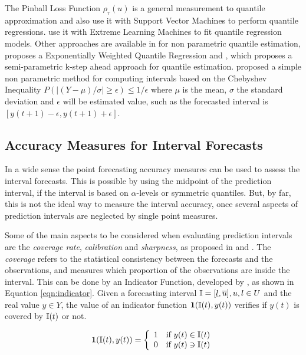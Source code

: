 The Pinball Loss Function $\rho_\tau(u)$ is a general measurement to quantile approximation and \cite{Steinwart2011} also use it with Support Vector Machines to perform quantile regressions. \cite{Wan2014} use it with Extreme Learning Machines to fit quantile regression models. Other approaches are available in \cite{Takeuchi2006} for non parametric quantile estimation,  \cite{Taylor2007} proposes a Exponentially Weighted Quantile Regression and \cite{Hansen2006}, which proposes a semi-parametric k-step ahead approach for quantile estimation. \cite{Gardner1998} proposed a simple non parametric method for computing intervals based on the Chebyshev Inequality $P(|(Y-\mu)/\sigma|\geq \epsilon) \leq 1/\epsilon$ where $\mu$ is the mean, $\sigma$ the standard deviation and $\epsilon$ will be estimated value, such as the forecasted interval is $[y(t+1) - \epsilon, y(t+1) + \epsilon]$.

%
\subsection{Accuracy Measures for Interval Forecasts}
\label{sec:prob_interval_measures}

In a wide sense the point forecasting accuracy measures can be used to assess the interval forecasts. This is possible by using the midpoint of the prediction interval, if the interval is based on $\alpha$-levels or symmetric quantiles. But, by far, this is not the ideal way to measure the interval accuracy, once several aspects of prediction intervals are neglected by single point measures.

Some of the main aspects to be considered when evaluating prediction intervals are the \textit{coverage rate}, \textit{calibration} and \textit{sharpness}, as proposed in \cite{Gneiting2007} and \cite{Pinson2006}. The \textit{coverage} refers to the statistical consistency between the forecasts and the observations, and measures which proportion of the observations are inside the interval. This can be done by an Indicator Function, developed by \cite{Christoffersen1998}, as shown in Equation \eqref{eqn:indicator}. Given a forecasting interval $\mathbb{I} = [\underline{l},\overline{u}{]}, u,l \in U$ and the real value $y\in Y$, the value of an indicator function $\mathbf{1}(\mathbb{I}(t),y(t))$ verifies if $y(t)$ is covered by $\mathbb{I}(t)$ or not.

\begin{equation}
\mathbf{1}(\mathbb{I}(t),y(t)) = \left\{ \begin{array}{cl}
1 & \text{if }y(t) \in \mathbb{I}(t) \\
0 & \text{if }y(t) \ni \mathbb{I}(t) 
\end{array} \right.
\label{eqn:indicator}
\end{equation}

